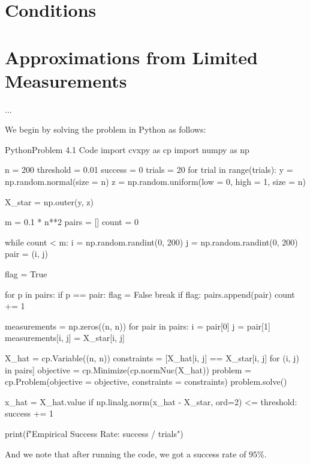 \documentclass{article}
\begin{document}
\section{Conditions}
\begin{hw}{1}
	
\end{hw}

\section{Approximations from Limited Measurements}
\begin{hw}{1}
	...
\end{hw}
\begin{solution}
	We begin by solving the problem in Python as follows:

\begin{code}{Python}{Problem 4.1 Code}
import cvxpy as cp
import numpy as np

n = 200
threshold = 0.01
success = 0
trials = 20
for trial in range(trials):
	y = np.random.normal(size = n)
	z = np.random.uniform(low = 0, high = 1, size = n)
	
	X_star = np.outer(y, z)
	
	m = 0.1 * n**2
	pairs = []
	count = 0
	
	while count < m:
		i = np.random.randint(0, 200)
		j = np.random.randint(0, 200)
		pair = (i, j)
		
		flag = True
		
		for p in pairs:
		if p == pair:
			flag = False
			break
		if flag:
			pairs.append(pair)
			count += 1
	
	measurements = np.zeros((n, n))
	for pair in pairs:
	i = pair[0]
	j = pair[1]
	measurements[i, j] = X_star[i, j]
	
	X_hat = cp.Variable((n, n))
	constraints = [X_hat[i, j] == X_star[i, j] for (i, j) in pairs]
	objective = cp.Minimize(cp.normNuc(X_hat))
	problem = cp.Problem(objective = objective, constraints = constraints)
	problem.solve()
	
	x_hat = X_hat.value
	if np.linalg.norm(x_hat - X_star, ord=2) <= threshold:
		success += 1
	
print(f"Empirical Success Rate: {success / trials}")
\end{code}

And we note that after running the code, we got a success rate of $95\%$.
\end{solution}
\end{document}
